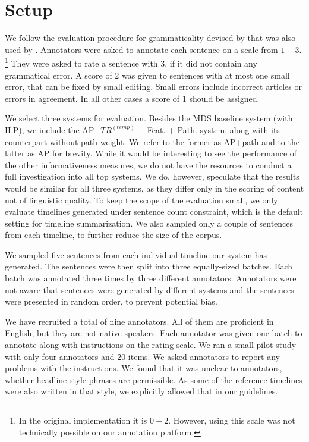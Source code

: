 \documentclass[a4paper,BCOR=10mm]{report}
\numberwithin{lemma}{chapter}
\numberwithin{definition}{chapter}
\begin{document}
\section{Setup}

We follow the evaluation procedure for grammaticality devised by \citet{mckeown} that was also used by \citet{filippova}.
Annotators were asked to annotate each sentence on a scale from $1-3$. \footnote{In the original implementation it is $0-2$. However, using this scale was not technically possible on our annotation platform.} They were asked to rate a sentence with 3, if it did not contain any grammatical error. A score of 2 was given to sentences with at most one small error, that can be fixed by small editing. Small errors include incorrect articles or errors in agreement. In all other cases a score of 1 should be assigned.

We select three systems for evaluation. Besides the MDS baseline system (with ILP), we include the AP+$TR^{(temp)}$ + Feat. + Path. system, along with its counterpart without path weight. We refer to the former as AP+path and to the latter as AP for brevity. While it would be interesting to see the performance of the other informativeness measures, we do not have the resources to conduct a full investigation into all top systems.
We do, however, speculate that the results would be similar for all three systems, as they differ only in the scoring of content not of linguistic quality.
To keep the scope of the evaluation small, we only evaluate timelines generated under sentence count constraint, which is the default setting for timeline summarization. We also sampled only a couple of sentences from each timeline, to further reduce the size of the corpus.

We sampled five sentences from each individual timeline our system has generated.
The sentences were then split into three equally-sized batches. Each batch was annotated three times by three different annotators.
Annotators were not aware that sentences were generated by different systems and the sentences were presented in random order, to prevent potential bias.

We have recruited a total of nine annotators. All of them are proficient in English, but they are not native speakers.
Each annotator was given one batch to annotate along with instructions on the rating scale. We ran a small pilot study with only four annotators and 20 items. We asked annotators to report any problems with the instructions. We found that it was unclear to annotators, whether headline style phrases are permissible.
As some of the reference timelines were also written in that style, we explicitly allowed that in our guidelines.
\end{document}
